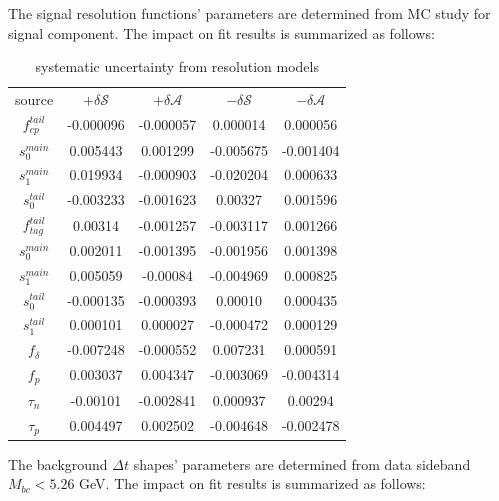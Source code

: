 The signal resolution functions' parameters are determined from MC study for signal component. The impact on fit results is summarized as follows: 
\begin{table}[H]
	\begin{minipage}[b]{1.0\linewidth}
		\centering
		\caption{systematic uncertainty from resolution models}
		\begin{tabular}{c c c c c}
			\hline
			source & $+\delta \mathcal{S}$ & $+\delta \mathcal{A}$ & $-\delta \mathcal{S}$ &  $-\delta \mathcal{A}$\\
			$f_{cp}^{tail}$ & -0.000096 & -0.000057
			& 0.000014
			& 0.000056
			\\
			$s_0^{main}$& 0.005443
			& 0.001299
			& -0.005675
			& -0.001404
			\\
			$s_1^{main}$ & 0.019934
			& -0.000903
			& -0.020204
			& 0.000633
			\\
			$s_0^{tail}$ &  -0.003233
			& -0.001623
			& 0.00327
			& 0.001596
			\\
			$f_{tag}^{tail}$ & 0.00314
			& -0.001257
			& -0.003117
			& 0.001266
			\\
			$s_0^{main}$&  0.002011
			& -0.001395
			& -0.001956
			& 0.001398
			\\
			$s_1^{main}$ & 0.005059
			& -0.00084
			& -0.004969
			& 0.000825
			\\
			$s_0^{tail}$ &  -0.000135
			& -0.000393
			& 0.00010 & 0.000435
			\\
			$s_1^{tail}$  & 0.000101 & 0.000027 &  -0.000472
			& 0.000129
			\\
			$f_{\delta}$ & -0.007248
			& -0.000552
			& 0.007231
			& 0.000591
			\\
			$f_p$ &  0.003037
			& 0.004347
			& -0.003069
			& -0.004314
			\\
			$\tau_n$ & -0.00101 & -0.002841
			& 0.000937
			& 0.00294
			\\
			$\tau_p$ &  0.004497
			& 0.002502
			& -0.004648
			& -0.002478
			\\
			\hline
		\end{tabular}
	\end{minipage}
\end{table}
The background $\Delta t$ shapes' parameters are determined from data sideband $M_{bc}<5.26$ GeV. The impact on fit results is summarized as follows: 
